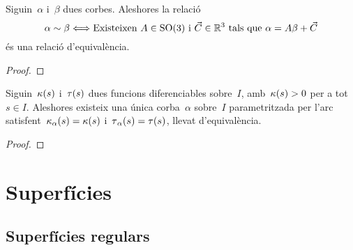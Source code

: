 \documentclass[../../main.tex]{subfiles}
\begin{document}
	\begin{lemma}
		\label{lemma:Teorema Fonamental de la teoria local de corbes}
		Siguin~\(\alpha\) i~\(\beta\) dues corbes.
		Aleshores la relació
		\[
		    \alpha\sim\beta \Longleftrightarrow \text{Existeixen }A\in\operatorname{SO}(3)\text{ i }\vec{C}\in\mathbb{R}^{3}\text{ tals que }\alpha=A\beta+\vec{C}
		\]
		és una relació d'equivalència.
		\begin{proof}
		\end{proof}
	\end{lemma}
	\begin{theorem}
		\label{thm:Teorema Fonamental de la teoria local del corbes}
		Siguin~\(\operatorname{\kappa}(s)\) i~\(\operatorname{\tau}(s)\) dues funcions diferenciables sobre~\(I\), amb~\(\operatorname{\kappa}(s)>0\) per a tot~\(s\in I\).
		Aleshores existeix una única corba~\(\alpha\) sobre~\(I\) parametritzada per l'arc satisfent~\(\operatorname{\kappa}_{\alpha}(s)=\operatorname{\kappa}(s)\) i~\(\operatorname{\tau}_{\alpha}(s)=\operatorname{\tau}(s)\), llevat d'equivalència.
		\begin{proof}
		\end{proof}
	\end{theorem}
\chapter{Superfícies}
\section{Superfícies regulars}
\end{document}
